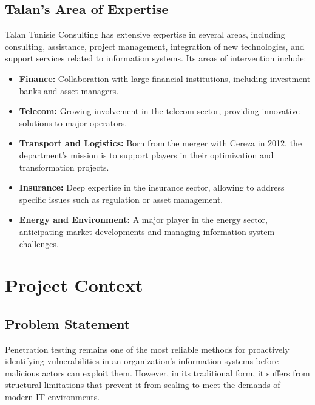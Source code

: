 \documentclass[12pt,a4paper]{report}
\begin{document}
\subsection{Talan's Area of Expertise}

Talan Tunisie Consulting has extensive expertise in several areas, including
consulting, assistance, project management, integration of new technologies, and
support services related to information systems. Its areas of intervention include:

\begin{itemize}
    \item \textbf{Finance:} Collaboration with large financial institutions, including
    investment banks and asset managers.
    \item \textbf{Telecom:} Growing involvement in the telecom sector, providing
    innovative solutions to major operators.
    \item \textbf{Transport and Logistics:} Born from the merger with Cereza in 2012,
    the department's mission is to support players in their optimization and
    transformation projects.
    \item \textbf{Insurance:} Deep expertise in the insurance sector, allowing to
    address specific issues such as regulation or asset management.
    \item \textbf{Energy and Environment:} A major player in the energy sector,
    anticipating market developments and managing information system challenges.
\end{itemize}

\section{Project Context}

\subsection{Problem Statement}

Penetration testing remains one of the most reliable methods for proactively
identifying vulnerabilities in an organization's information systems before malicious
actors can exploit them. However, in its traditional form, it suffers from structural
limitations that prevent it from scaling to meet the demands of modern IT environments.
\end{document}
